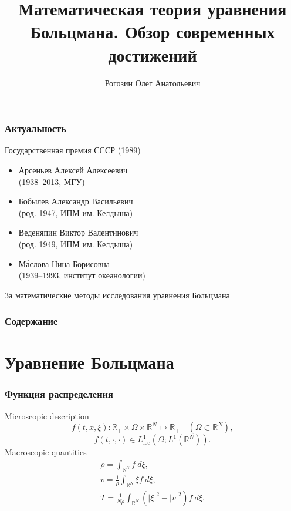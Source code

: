 \documentclass[mathserif]{beamer} %
\title{Математическая теория уравнения Больцмана. Обзор современных достижений}
\author{Рогозин Олег Анатольевич}
\institute{
    Вычислительный центр ФИЦ ИУ РАН
}
\date{}
\newcommand{\loc}{\mathrm{loc}}
\newcommand{\dd}{\:d}%
\newcommand{\dxi}{\dd\xi}
\begin{document}
\frame{\titlepage}

\begin{frame}
    \frametitle{Актуальность}
    \begin{block}{Государственная премия СССР (1989)}
        \begin{itemize}
            \item Арсеньев Алексей Алексеевич\\ (1938--2013, МГУ)
            \item Бобылев Александр Васильевич\\ (род. 1947, ИПМ им. Келдыша)
            \item Веденяпин Виктор Валентинович\\ (род. 1949, ИПМ им. Келдыша)
            \item М\'{а}слова Нина Борисовна\\ (1939--1993, институт океанологии)
        \end{itemize}
        За математические методы исследования уравнения Больцмана
    \end{block}
\end{frame}

\begin{frame}
    \frametitle{Содержание}
    \linespread{0.8}
    \tableofcontents
\end{frame}

\section{Уравнение Больцмана}

\begin{frame}
    \frametitle{Функция распределения}
    Microscopic description %
    \begin{equation*}
        f(t,x,\xi): \mathbb{R}_+\times\Omega\times\mathbb{R}^N\mapsto\mathbb{R}_+
        \quad (\Omega\subset\mathbb{R}^N),
    \end{equation*}
    \begin{equation*}
        f(t,\cdot,\cdot) \in L^1_\loc(\Omega; L^1(\mathbb{R}^N)).
    \end{equation*}
    Macroscopic quantities %
    \begin{gather*}
        \rho = \int_{\mathbb{R}^N} f\dxi, \\
        v = \frac1\rho\int_{\mathbb{R}^N} \xi f\dxi, \\
        T = \frac1{N\rho}\int_{\mathbb{R}^N} \left(|\xi|^2 - |v|^2\right) f\dxi.
    \end{gather*}
\end{frame}
\end{document}
